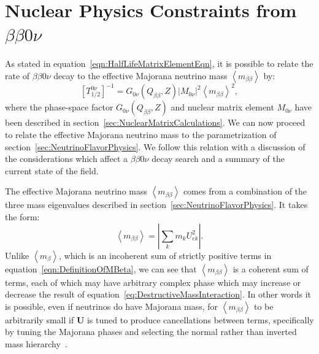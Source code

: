 \section{Nuclear Physics Constraints from \texorpdfstring{$\beta\beta 0\nu$}{Neutrinoless Double-Beta}}\label{sec:NucPhysConstraintsFromBB0N}

As stated in equation~\ref{eqn:HalfLifeMatrixElementEqn}, it is possible to relate the rate of $\beta\beta 0\nu$ decay to the effective Majorana neutrino mass $\left< m_{\beta\beta} \right>$ by:
\begin{equation}\label{eqn:HalfLifeMatrixElementEqn_thelatter}
\left[T^{0\nu}_{1/2}\right]^{-1} = G_{0\nu}(Q_{\beta\beta}, Z) \left| M_{0\nu}\right|^2 \left< m_{\beta\beta} \right>^2,
\end{equation}
where the phase-space factor $G_{0\nu}(Q_{\beta\beta}, Z)$ and nuclear matrix element $M_{0\nu}$ have been described in section~\ref{sec:NuclearMatrixCalculations}.  We can now proceed to relate the effective Majorana neutrino mass to the parametrization of section~\ref{sec:NeutrinoFlavorPhysics}.  We follow this relation with a discussion of the considerations which affect a $\beta\beta 0\nu$ decay search and a summary of the current state of the field.

The effective Majorana neutrino mass $\left< m_{\beta\beta} \right>$ comes from a combination of the three mass eigenvalues described in section~\ref{sec:NeutrinoFlavorPhysics}.  It takes the form:
\begin{equation} \label{eq:DestructiveMassInteraction}
\left< m_{\beta\beta} \right> = \left|\sum_k m_k U_{ek}^2\right|.
\end{equation}
Unlike $\left< m_\beta \right>$, which is an incoherent sum of strictly positive terms in equation~\ref{eqn:DefinitionOfMBeta}, we can see that $\left< m_{\beta\beta} \right>$ is a coherent sum of terms, each of which may have arbitrary complex phase which may increase or decrease the result of equation~\ref{eq:DestructiveMassInteraction}.  In other words it is possible, even if neutrinos do have Majorana mass, for $\left< m_{\beta\beta} \right>$ to be arbitrarily small if $\mathbf{U}$ is tuned to produce cancellations between terms, specifically by tuning the Majorana phases and selecting the normal rather than inverted mass hierarchy~\cite{PDG}.

